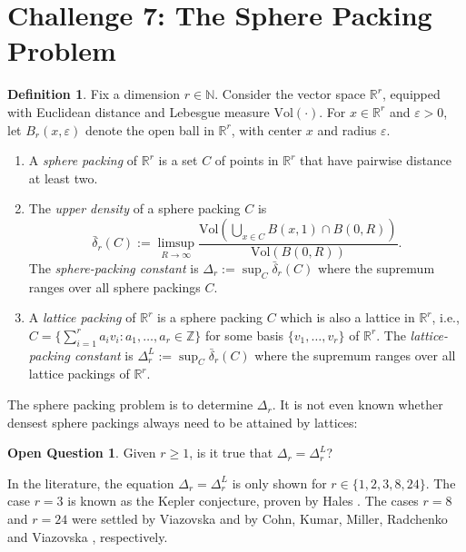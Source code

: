 \documentclass[12pt]{article}
\numberwithin{equation}{section}
\theoremstyle{definition}
\newtheorem{definition}{Definition}
\newtheorem{openquestion}[theorem]{Open Question}
\newcommand{\ev}[1]{( #1 )}
\newcommand{\ew}[1]{\left( #1 \right)}
\newcommand{\N}{\mathbb{N}}
\newcommand{\Z}{\mathbb{Z}}
\newcommand{\R}{\mathbb{R}}
\begin{document}
\section*{Challenge 7: The Sphere Packing Problem}

\begin{definition} 
Fix a dimension $r \in \N$. Consider the vector space $\R^r$, equipped with Euclidean distance and Lebesgue measure $\mathrm{Vol}(\cdot)$. For $x \in \R^r$ and $\varepsilon >0$, let $B_r\ev{x,\varepsilon}$ denote the open ball in $\R^r$, with center $x$ and radius $\varepsilon$. 
\begin{enumerate}
\item A \emph{sphere packing} of $\R^r$ is a set $C$ of points in $\R^r$ that have pairwise distance at least two. 
\item The \emph{upper density} of a sphere packing $C$ is
$$
\bar\delta_r\ev{C} := \limsup_{R \to \infty} \frac{\mathrm{Vol}\!\ew{\textstyle\bigcup_{x \in C} B\ev{x,1} \cap B\ev{0,R}}}{\mathrm{Vol}\!\ew{B\ev{0,R}}}.
$$
The \emph{sphere-packing constant} is $\Delta_r := \sup_C \bar\delta_r\ev{C}$ where the supremum ranges over all sphere packings $C$. 

\item A \textit{lattice packing} of $\R^r$ is a sphere packing $C$ which is also a lattice in $\R^r$, i.e., $C = \{ \sum_{i=1}^{r} a_i v_i : a_1,\ldots, a_r \in \Z \} $ for some basis $\{ v_1, \dots, v_r \}$ of $\R^r$. The \emph{lattice-packing constant} is $\Delta_r^{L} := \sup_C \bar\delta_r\ev{C}$ where the supremum ranges over all lattice packings of $\R^r$.
\end{enumerate}
\end{definition}

The sphere packing problem is to determine $\Delta_r$. It is not even known whether densest sphere packings always need to be attained by lattices:

\begin{openquestion}
Given $r\geq 1$, is it true that $\Delta_r = \Delta_r^{L}$?
\end{openquestion}

In the literature, the equation $\Delta_r = \Delta_r^{L}$ is only shown for $r \in \{1,2,3,8,24\}$. The case $r=3$ is known as the Kepler conjecture, proven by  Hales \cite{hales2005kepler}. The cases $r = 8$ and $r = 24$ were settled by Viazovska \cite{viazovska2017eight} and by Cohn, Kumar, Miller, Radchenko and Viazovska \cite{cohn2017twentyfour}, respectively. 

\printbibliography
\end{document}
